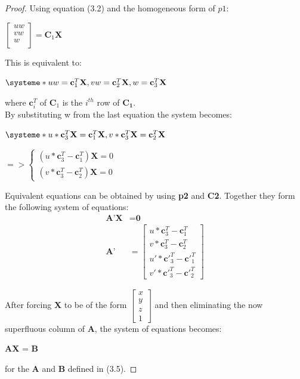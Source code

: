 \documentclass[12pt,a4paper,twoside,openright]{report}
\begin{document}
\begin{proof}
Using equation (3.2) and the homogeneous form of $p1$: \\
\begin{center}
$\begin{bmatrix}
	uw \\
	vw \\
	w \\
 \end{bmatrix} = \textbf{C}_{1}\textbf{X}$
\end{center}
This is equivalent to:
\begin{center}
$\systeme*{
uw = \textbf{c}_{1}^T \textbf{X},
vw = \textbf{c}_{2}^T \textbf{X},
w = \textbf{c}_{3}^T  \textbf{X}}$
\end{center}
where  $\mathbf{c}_{i}^T$ of $\mathbf{C}_{1}$ is the $i^{th}$ row of $\mathbf{C_{1}}$. \\

By substituting w from the last equation the system becomes:
\begin{center}
$\systeme*{
u * \textbf{c}_{3}^T \textbf{X} = \textbf{c}_{1}^T \textbf{X},
v * \textbf{c}_{3}^T \textbf{X} = \textbf{c}_{2}^T \textbf{X}}$ \\
\end{center}
\begin{center}
$ => \begin{cases}
(u * \mathbf{c}_{3}^T - \mathbf{c}_{1}^T) \mathbf{X} = 0  \\
(v * \textbf{c}_{3}^T - \mathbf{c}_{2}^T) \mathbf{X} = 0
\end{cases}$
\end{center}

Equivalent equations can be obtained by using \textbf{p2} and \textbf{C2}. Together they form the following system of equations:
\begin{align}
	\textbf{A'}\textbf{X} &= \textbf{0}\\ 
\textbf{A'} &= \begin{bmatrix}
u * \mathbf{c}_{3}^T - \mathbf{c}_{1}^T\\
v * \mathbf{c}_{3}^T - \mathbf{c}_{2}^T\\
u' * \mathbf{c'}_{3}^T - \mathbf{c'}_{1}^T\\
v' * \mathbf{c'}_{3}^T - \mathbf{c'}_{2}^T
\end{bmatrix}
\end{align}

After forcing \textbf{X} to be of the form 
$\begin{bmatrix}
x \\
y \\
z \\
1
\end{bmatrix}$ and then eliminating the now superfluous column of \textbf{A}, the system of equations becomes:
\begin{center}
	\textbf{A}\textbf{X} = \textbf{B}
\end{center} for the \textbf{A} and \textbf{B} defined in (3.5).
\end{proof}
\end{document}
